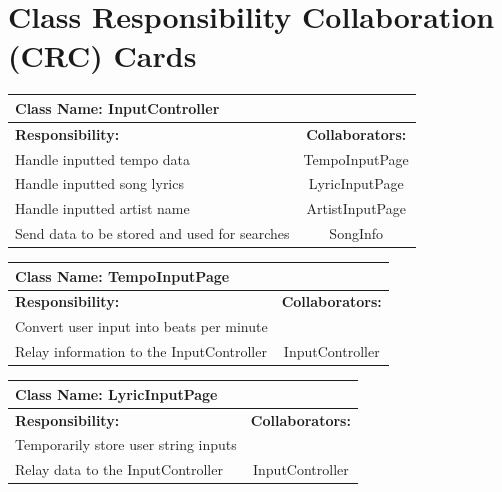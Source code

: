 \documentclass[]{article}
\begin{document}
\section{Class Responsibility Collaboration (CRC) Cards}
\label{sec:class_responsibility_collaboration_crc_cards}
	\begin{table}[a]
		\centering
		\begin{tabular}{| p{8cm} | c |} \hline
			\multicolumn{2}{|l|}{\textbf{Class Name: InputController}} \\ \hline
			\textbf{Responsibility:} & \textbf{Collaborators:} \\ \hline
			Handle inputted tempo data & TempoInputPage \\ \hline
			Handle inputted song lyrics & LyricInputPage \\ \hline
			Handle inputted artist name & ArtistInputPage \\ \hline
			Send data to be stored and used for searches & SongInfo \\ \hline
		\end{tabular}
	\end{table}
	
	\begin{table}[a]
		\centering
		\begin{tabular}{| p{8cm} | c |} \hline
			\multicolumn{2}{|l|}{\textbf{Class Name: TempoInputPage}} \\ \hline
			\textbf{Responsibility:} & \textbf{Collaborators:} \\ \hline
			Convert user input into beats per minute &   \\ \hline
			Relay information to the InputController & InputController \\ \hline
		\end{tabular}
	\end{table}
	
	\begin{table}[a]
		\centering
		\begin{tabular}{| p{8cm} | c |} \hline
			\multicolumn{2}{|l|}{\textbf{Class Name: LyricInputPage}} \\ \hline
			\textbf{Responsibility:} & \textbf{Collaborators:} \\ \hline
			Temporarily store user string inputs &   \\ \hline
			Relay data to the InputController & InputController \\ \hline
		\end{tabular}
	\end{table}
	
\end{document}
